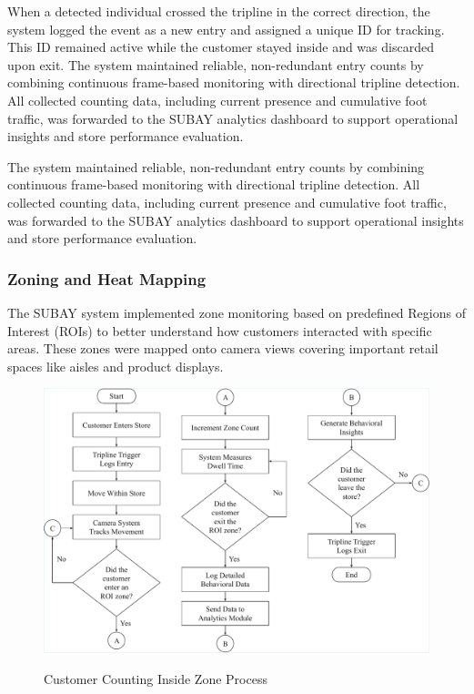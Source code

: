 {When a detected individual crossed the tripline in the correct direction, the system logged the event as a new entry and assigned a unique ID for tracking. This ID remained active while the customer stayed inside and was discarded upon exit. The system maintained reliable, non-redundant entry counts by combining continuous frame-based monitoring with directional tripline detection. All collected counting data, including current presence and cumulative foot traffic, was forwarded to the SUBAY analytics dashboard to support operational insights and store performance evaluation.

The system maintained reliable, non-redundant entry counts by combining continuous frame-based monitoring with directional tripline detection. All collected counting data, including current presence and cumulative foot traffic, was forwarded to the SUBAY analytics dashboard to support operational insights and store performance evaluation.

\subsubsection{Zoning and Heat Mapping}

The SUBAY system implemented zone monitoring based on predefined Regions of Interest (ROIs) to better understand how customers interacted with specific areas. These zones were mapped onto camera views covering important retail spaces like aisles and product displays.

\begin{figure}[H]
	\caption[Customer Counting Inside Zone Process]{\newline \newline Customer Counting Inside Zone Process}
	\centering
	\includegraphics[width=0.75\linewidth]{fig/3.21.pdf}
	\label{fig:3.21}
\end{figure}

}

